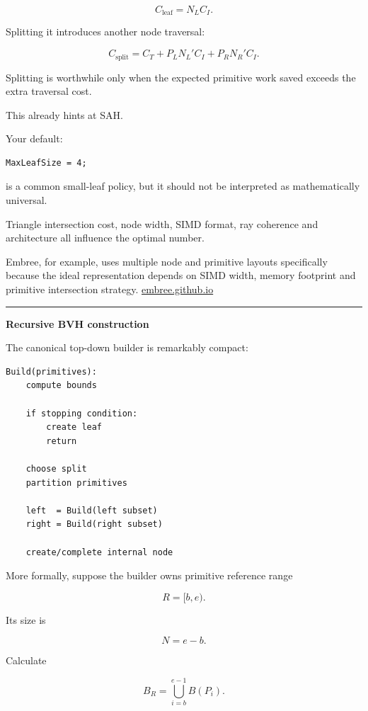 \[
C_{\text{leaf}}
=
N_L C_I.
\]

Splitting it introduces another node traversal:

\[
C_{\text{split}}
=
C_T
+
P_L N_L'C_I
+
P_R N_R'C_I.
\]

Splitting is worthwhile only when the expected primitive work saved exceeds the extra traversal cost.

This already hints at SAH.

Your default:

\begin{verbatim}
MaxLeafSize = 4;
\end{verbatim}

is a common small-leaf policy, but it should not be interpreted as mathematically universal.

Triangle intersection cost, node width, SIMD format, ray coherence and architecture all influence the optimal number.

Embree, for example, uses multiple node and primitive layouts specifically because the ideal representation depends on SIMD width, memory footprint and primitive intersection strategy. \href{https://embree.github.io/papers/2014-Siggraph-Embree.pdf?utm_source=chatgpt.com}{embree.github.io}

\begin{center}\rule{0.5\linewidth}{0.5pt}\end{center}

\textbf{Recursive BVH construction}

The canonical top-down builder is remarkably compact:

\begin{verbatim}
Build(primitives):
    compute bounds

    if stopping condition:
        create leaf
        return

    choose split
    partition primitives

    left  = Build(left subset)
    right = Build(right subset)

    create/complete internal node
\end{verbatim}

More formally, suppose the builder owns primitive reference range

\[
R=[b,e).
\]

Its size is

\[
N=e-b.
\]

Calculate

\[
B_R=\bigcup_{i=b}^{e-1}B(P_i).
\]

